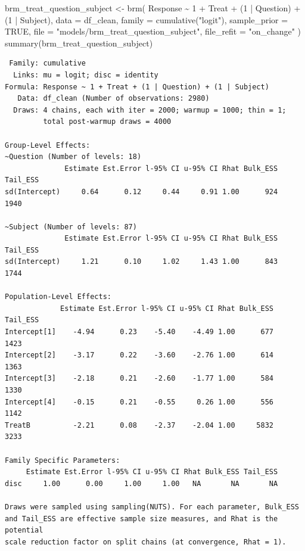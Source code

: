 \documentclass[
  12pt,
  a4paper,
  extrafontsizes,
  onecolumn,
  openright]{memoir}
\newenvironment{Shaded}{\begin{snugshade}}{\end{snugshade}}
\newcommand{\AttributeTok}[1]{\textcolor[rgb]{0.40,0.45,0.13}{#1}}
\newcommand{\ConstantTok}[1]{\textcolor[rgb]{0.56,0.35,0.01}{#1}}
\newcommand{\DecValTok}[1]{\textcolor[rgb]{0.68,0.00,0.00}{#1}}
\newcommand{\FunctionTok}[1]{\textcolor[rgb]{0.28,0.35,0.67}{#1}}
\newcommand{\NormalTok}[1]{\textcolor[rgb]{0.00,0.23,0.31}{#1}}
\newcommand{\OtherTok}[1]{\textcolor[rgb]{0.00,0.23,0.31}{#1}}
\newcommand{\SpecialCharTok}[1]{\textcolor[rgb]{0.37,0.37,0.37}{#1}}
\newcommand{\StringTok}[1]{\textcolor[rgb]{0.13,0.47,0.30}{#1}}
\begin{document}
\begin{Shaded}
\begin{Highlighting}[]
\NormalTok{brm\_treat\_question\_subject }\OtherTok{\textless{}{-}} \FunctionTok{brm}\NormalTok{(}
\NormalTok{    Response }\SpecialCharTok{\textasciitilde{}} \DecValTok{1} \SpecialCharTok{+}\NormalTok{ Treat }\SpecialCharTok{+}\NormalTok{ (}\DecValTok{1} \SpecialCharTok{|}\NormalTok{ Question) }\SpecialCharTok{+}\NormalTok{ (}\DecValTok{1} \SpecialCharTok{|}\NormalTok{ Subject),}
    \AttributeTok{data =}\NormalTok{ df\_clean,}
    \AttributeTok{family =} \FunctionTok{cumulative}\NormalTok{(}\StringTok{"logit"}\NormalTok{),}
    \AttributeTok{sample\_prior =} \ConstantTok{TRUE}\NormalTok{,}
    \AttributeTok{file =} \StringTok{"models/brm\_treat\_question\_subject"}\NormalTok{,}
    \AttributeTok{file\_refit =} \StringTok{"on\_change"}
\NormalTok{)}
\FunctionTok{summary}\NormalTok{(brm\_treat\_question\_subject)}
\end{Highlighting}
\end{Shaded}

\begin{verbatim}
 Family: cumulative 
  Links: mu = logit; disc = identity 
Formula: Response ~ 1 + Treat + (1 | Question) + (1 | Subject) 
   Data: df_clean (Number of observations: 2980) 
  Draws: 4 chains, each with iter = 2000; warmup = 1000; thin = 1;
         total post-warmup draws = 4000

Group-Level Effects: 
~Question (Number of levels: 18) 
              Estimate Est.Error l-95% CI u-95% CI Rhat Bulk_ESS Tail_ESS
sd(Intercept)     0.64      0.12     0.44     0.91 1.00      924     1940

~Subject (Number of levels: 87) 
              Estimate Est.Error l-95% CI u-95% CI Rhat Bulk_ESS Tail_ESS
sd(Intercept)     1.21      0.10     1.02     1.43 1.00      843     1744

Population-Level Effects: 
             Estimate Est.Error l-95% CI u-95% CI Rhat Bulk_ESS Tail_ESS
Intercept[1]    -4.94      0.23    -5.40    -4.49 1.00      677     1423
Intercept[2]    -3.17      0.22    -3.60    -2.76 1.00      614     1363
Intercept[3]    -2.18      0.21    -2.60    -1.77 1.00      584     1330
Intercept[4]    -0.15      0.21    -0.55     0.26 1.00      556     1142
TreatB          -2.21      0.08    -2.37    -2.04 1.00     5832     3233

Family Specific Parameters: 
     Estimate Est.Error l-95% CI u-95% CI Rhat Bulk_ESS Tail_ESS
disc     1.00      0.00     1.00     1.00   NA       NA       NA

Draws were sampled using sampling(NUTS). For each parameter, Bulk_ESS
and Tail_ESS are effective sample size measures, and Rhat is the potential
scale reduction factor on split chains (at convergence, Rhat = 1).
\end{verbatim}
\end{document}
